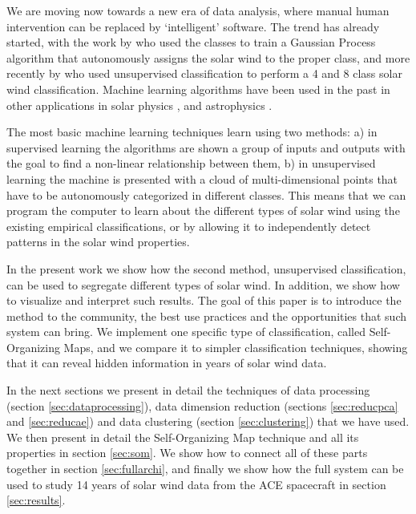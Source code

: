 \documentclass[utf8]{frontiersSCNS} %
\begin{document}
We are moving now towards a new era of data analysis, where manual human intervention can be replaced by `intelligent' software. The trend has already started, with the work by \citep{Camporeale2017b} who used the \citep{Xu2015b} classes to train a Gaussian Process algorithm that autonomously assigns the solar wind to the proper class, and more recently by \citep{Roberts2020} who used unsupervised classification to perform a 4 and 8 class solar wind classification. Machine learning algorithms have been used in the past in other applications in solar physics \citep{Lundstedt1996,Qahwaji2008c,Ahmed2013c,Bobra2015,Bobra2016,Nishizuka2017c,Camporeale2018}, and astrophysics \citep{VanderPlas2012,Ntampaka2015,Hajian2015,Suveges2017,Bai2018,Bonjean2019}.

The most basic machine learning techniques learn using two methods: a) in supervised learning the algorithms are shown a group of inputs and outputs with the goal to find a non-linear relationship between them, b) in unsupervised learning the machine is presented with a cloud of multi-dimensional points that have to be autonomously categorized in different classes. This means that we can program the computer to learn about the different types of solar wind using the existing empirical classifications, or by allowing it to independently detect patterns in the solar wind properties.

In the present work we show how the second method, unsupervised classification, can be used to segregate different types of solar wind. In addition, we show how to visualize and interpret such results. The goal of this paper is to introduce the method to the community, the best use practices and the opportunities that such system can bring. We implement one specific type of classification, called Self-Organizing Maps, and we compare it to simpler classification techniques, showing that it can reveal hidden information in years of solar wind data.

In the next sections we present in detail the techniques of data processing (section \ref{sec:dataprocessing}), data dimension reduction (sections \ref{sec:reducpca} and \ref{sec:reducae}) and data clustering (section \ref{sec:clustering}) that we have used. We then present in detail the Self-Organizing Map technique and all its properties in section \ref{sec:som}. We show how to connect all of these parts together in section \ref{sec:fullarchi}, and finally we show how the full system can be used to study 14 years of solar wind data from the ACE spacecraft in section \ref{sec:results}.
\end{document}
